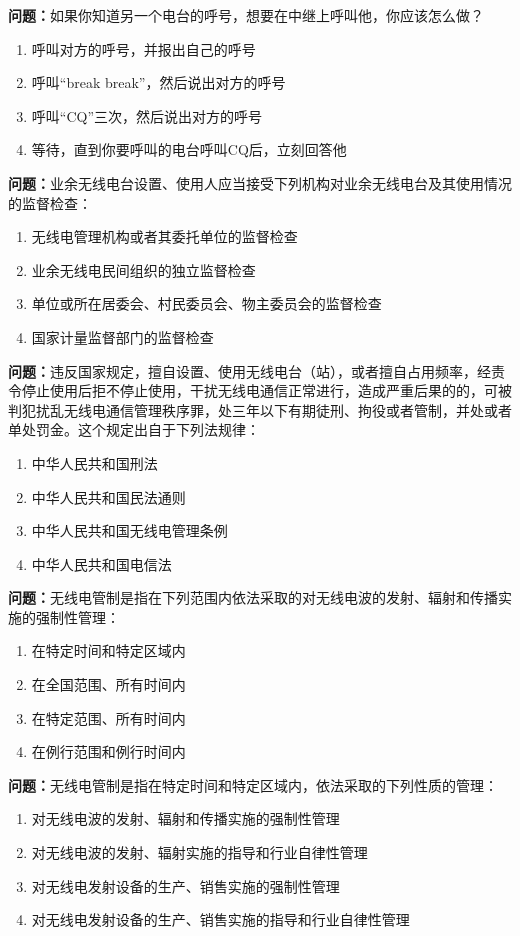 \documentclass{ctexbook}
\begin{document}
\textbf{问题：}如果你知道另一个电台的呼号，想要在中继上呼叫他，你应该怎么做？
\begin{enumerate}[label=\Alph*), leftmargin=3em]
\item 呼叫对方的呼号，并报出自己的呼号
\item 呼叫“break break”，然后说出对方的呼号
\item 呼叫“CQ”三次，然后说出对方的呼号
\item 等待，直到你要呼叫的电台呼叫CQ后，立刻回答他
\end{enumerate}

\textbf{问题：}业余无线电台设置、使用人应当接受下列机构对业余无线电台及其使用情况的监督检查：
\begin{enumerate}[label=\Alph*), leftmargin=3em]
\item 无线电管理机构或者其委托单位的监督检查
\item 业余无线电民间组织的独立监督检查
\item 单位或所在居委会、村民委员会、物主委员会的监督检查
\item 国家计量监督部门的监督检查
\end{enumerate}

\textbf{问题：}违反国家规定，擅自设置、使用无线电台（站），或者擅自占用频率，经责令停止使用后拒不停止使用，干扰无线电通信正常进行，造成严重后果的的，可被判犯扰乱无线电通信管理秩序罪，处三年以下有期徒刑、拘役或者管制，并处或者单处罚金。这个规定出自于下列法规律：
\begin{enumerate}[label=\Alph*), leftmargin=3em]
\item 中华人民共和国刑法
\item 中华人民共和国民法通则
\item 中华人民共和国无线电管理条例
\item 中华人民共和国电信法
\end{enumerate}

\textbf{问题：}无线电管制是指在下列范围内依法采取的对无线电波的发射、辐射和传播实施的强制性管理：
\begin{enumerate}[label=\Alph*), leftmargin=3em]
\item 在特定时间和特定区域内
\item 在全国范围、所有时间内
\item 在特定范围、所有时间内
\item 在例行范围和例行时间内
\end{enumerate}

\textbf{问题：}无线电管制是指在特定时间和特定区域内，依法采取的下列性质的管理：
\begin{enumerate}[label=\Alph*), leftmargin=3em]
\item 对无线电波的发射、辐射和传播实施的强制性管理
\item 对无线电波的发射、辐射实施的指导和行业自律性管理
\item 对无线电发射设备的生产、销售实施的强制性管理
\item 对无线电发射设备的生产、销售实施的指导和行业自律性管理
\end{enumerate}
\end{document}
